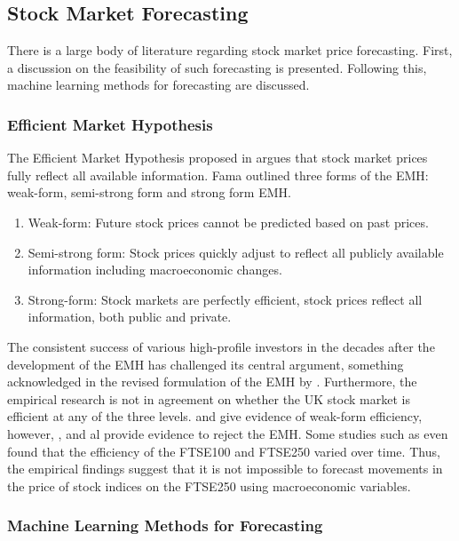 \documentclass[11pt,a4paper]{article}
\newcommand{\citeboth}[1]{\citeauthor{#1} \citep{#1}}
\begin{document}
\subsection{Stock Market Forecasting}

There is a large body of literature regarding stock market price forecasting. First, 
a discussion on the feasibility of such forecasting is presented. Following this, machine learning methods for forecasting are 
discussed.


\subsubsection{Efficient Market Hypothesis}

The Efficient Market Hypothesis proposed in \citeboth{fama1970} argues that stock market prices fully 
reflect all available information. Fama outlined three forms of the EMH:
weak-form, semi-strong form and strong form EMH.
\begin{enumerate}
    \item Weak-form: Future stock prices cannot be predicted based on past prices.
    \item Semi-strong form: Stock prices quickly adjust to reflect all publicly available information including macroeconomic changes.  
    \item Strong-form: Stock markets are perfectly efficient, stock prices reflect all information, both public and private.
\end{enumerate}

The consistent success of various high-profile investors in the decades 
after the development of the EMH has challenged 
its central argument, something acknowledged in the revised formulation of the EMH 
by \citeboth{fama1991}. Furthermore, the empirical research is not in 
agreement on whether the UK stock market is efficient at any of the three levels. 
\citeboth{libberton2010} and \citeboth{rounaghi} give evidence of weak-form efficiency,
however, \citeboth{borges2010}, \citeboth{asghar2023} and \citeboth{bhavsar2015} al provide evidence to reject the EMH. 
Some studies such as \citeboth{rosini2020} even found that the 
efficiency of the FTSE100 and FTSE250 varied over time. Thus, the empirical findings suggest 
that it is not impossible to forecast movements in the 
price of stock indices on the FTSE250 using macroeconomic variables.



\subsubsection{Machine Learning Methods for Forecasting}
\end{document}
